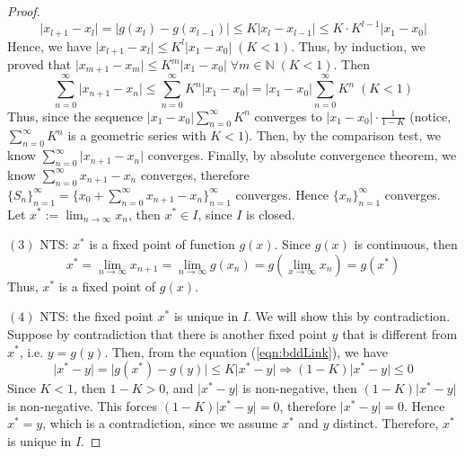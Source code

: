\documentclass{article}
\theoremstyle{definition}
\theoremstyle{remark}
\theoremstyle{example}
\begin{document}
\begin{proof}
    \begin{equation}
        \rvert x_{l + 1} - x_l \rvert = \lvert g(x_l) - g(x_{l-1}) \rvert \leq K \lvert x_l - x_{l-1}\rvert \leq K \cdot K^{l-1} \rvert x_1 - x_0 \rvert
    \end{equation}
    Hence, we have $\lvert x_{l+1} - x_l \rvert \leq K^l \lvert x_1 - x_0 \rvert \; (K < 1)$. Thus, by induction, we proved that $\lvert x_{m+1} - x_m \rvert \leq K^m \lvert x_1 - x_0 \rvert \; \forall m \in \mathbb{N} \; (K < 1)$. Then 
    \begin{equation}\label{eqn:comparison}
        \sum_{n = 0}^{\infty}{\lvert x_{n+1} - x_n \rvert} \leq \sum_{n = 0}^{\infty}{K^n\lvert x_1 - x_0 \rvert} = \lvert x_1 - x_0 \rvert \sum_{n = 0}^{\infty}{K^n} \; (K < 1)
    \end{equation}
    Thus, since the sequence $\lvert x_1 - x_0 \rvert \sum_{n = 0}^{\infty}{K^n}$ converges to $\lvert x_1 - x_0 \rvert \cdot \tfrac{1}{1-K}$ (notice, $\sum_{n = 0}^{\infty}{K^n}$ is a geometric series with $K < 1$). Then, by the comparison test, we know $\sum_{n = 0}^{\infty}{\lvert x_{n+1} - x_n \rvert}$ converges. Finally, by absolute convergence theorem, we know $\sum_{n = 0}^{\infty}{x_{n+1} - x_n}$ converges, therefore $\{S_n\}_{n = 1}^{\infty} = \{x_0 + \sum_{n = 0}^{\infty}{x_{n+1} - x_n}\}_{n = 1}^{\infty}$ converges. Hence $\{x_n\}_{n = 1}^{\infty}$ converges. Let $x^{*} := \lim_{n \to \infty}{x_n}$, then $x^{*} \in I$, since $I$ is closed.
    
    $(3)$ NTS: $x^{*}$ is a fixed point of function $g(x)$. \; Since $g(x)$ is continuous, then
    \begin{equation}
        x^{*} = \lim_{n\to \infty}{x_{n+1}} = \lim_{n \to \infty}{g(x_n)} = g(\lim_{x \to \infty}{x_n}) = g(x^{*})
    \end{equation}
    Thus, $x^{*}$ is a fixed point of $g(x)$.
    
    $(4)$ NTS: the fixed point $x^{*}$ is unique in $I$. \; We will show this by contradiction. Suppose by contradiction that there is another fixed point $y$ that is different from $x^{*}$, i.e. $y = g(y)$. Then, from the equation (\ref{eqn:bddLink}), we have
    \begin{equation}
        \lvert x^{*} - y \rvert = \lvert g(x^{*}) - g(y) \rvert \leq K \lvert x^{*} - y \rvert \Rightarrow (1-K)\lvert x^{*} - y \rvert \leq 0
    \end{equation}
    Since $K < 1$, then $1 - K > 0$, and $\lvert x^{*} - y \rvert$ is non-negative, then $(1-K)\lvert x^{*} - y \rvert$ is non-negative. This forces $(1-K)\lvert x^{*} - y \rvert = 0$, therefore $\lvert x^{*} - y \rvert = 0$. Hence $x^{*} = y$, which is a contradiction, since we assume $x^{*}$ and $y$ distinct. Therefore, $x^{*}$ is unique in $I$.
\end{proof}
\end{document}
